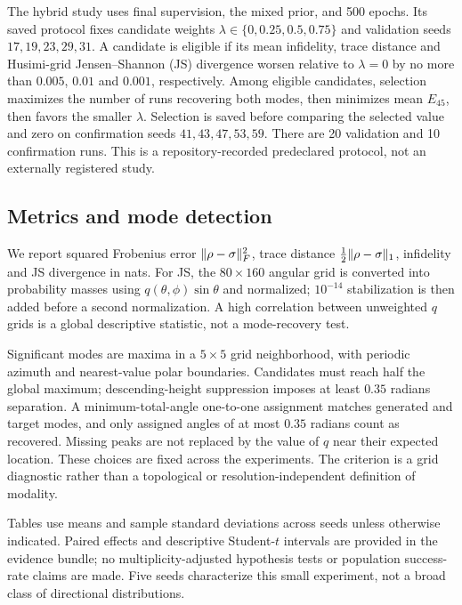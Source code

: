 The hybrid study uses final supervision, the mixed prior, and 500 epochs. Its saved protocol fixes candidate weights $\lambda\in\{0,0.25,0.5,0.75\}$ and validation seeds $17,19,23,29,31$. A candidate is eligible if its mean infidelity, trace distance and Husimi-grid Jensen--Shannon (JS) divergence worsen relative to $\lambda=0$ by no more than $0.005$, $0.01$ and $0.001$, respectively. Among eligible candidates, selection maximizes the number of runs recovering both modes, then minimizes mean $E_{45}$, then favors the smaller $\lambda$. Selection is saved before comparing the selected value and zero on confirmation seeds $41,43,47,53,59$. There are 20 validation and 10 confirmation runs. This is a repository-recorded predeclared protocol, not an externally registered study.

\subsection{Metrics and mode detection}
We report squared Frobenius error $\lVert \rho-\sigma\rVert_F^2$, trace distance $\frac12\lVert \rho-\sigma\rVert_1$, infidelity and JS divergence in nats. For JS, the $80\times160$ angular grid is converted into probability masses using $q(\theta,\phi)\sin\theta$ and normalized; $10^{-14}$ stabilization is then added before a second normalization. A high correlation between unweighted $q$ grids is a global descriptive statistic, not a mode-recovery test.

Significant modes are maxima in a $5\times5$ grid neighborhood, with periodic azimuth and nearest-value polar boundaries. Candidates must reach half the global maximum; descending-height suppression imposes at least $0.35$ radians separation. A minimum-total-angle one-to-one assignment matches generated and target modes, and only assigned angles of at most $0.35$ radians count as recovered. Missing peaks are not replaced by the value of $q$ near their expected location. These choices are fixed across the experiments. The criterion is a grid diagnostic rather than a topological or resolution-independent definition of modality.

Tables use means and sample standard deviations across seeds unless otherwise indicated. Paired effects and descriptive Student-$t$ intervals are provided in the evidence bundle; no multiplicity-adjusted hypothesis tests or population success-rate claims are made. Five seeds characterize this small experiment, not a broad class of directional distributions.

